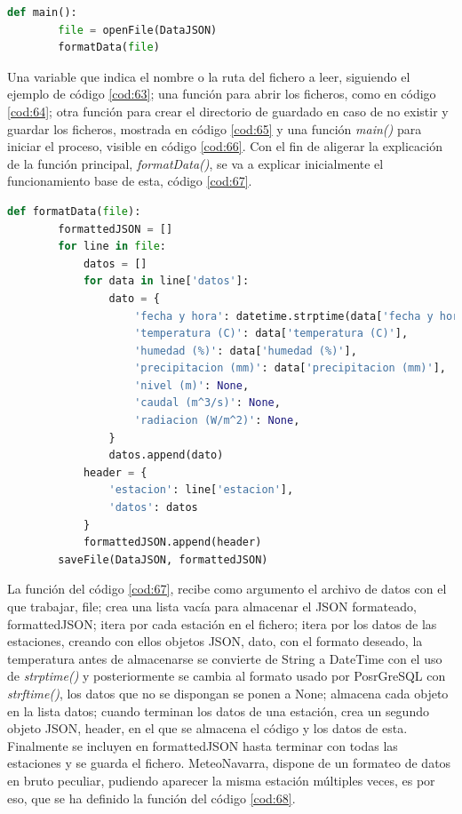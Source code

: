 \begin{lstlisting}[language=Python, caption={Declaración función \textit{main()}}, label=cod:66]
	def main():
		file = openFile(DataJSON)
		formatData(file)
\end{lstlisting}

Una variable que indica el nombre o la ruta del fichero a leer, siguiendo el ejemplo de código \ref{cod:63}; una función para abrir los ficheros, como en código \ref{cod:64}; otra función para crear el directorio de guardado en caso de no existir y guardar los ficheros, mostrada en código \ref{cod:65} y una función \textit{main()} para iniciar el proceso, visible en código \ref{cod:66}. Con el fin de aligerar la explicación de la función principal, \textit{formatData()}, se va a explicar inicialmente el funcionamiento base de esta, código \ref{cod:67}.

\begin{lstlisting}[language=Python, caption={Declaración función base \textit{formatData()}, concretamente esta versión es usada para formatear los datos de Aemet}, label=cod:67]
	def formatData(file):
		formattedJSON = []
		for line in file:
			datos = []
			for data in line['datos']:
				dato = {
					'fecha y hora': datetime.strptime(data['fecha y hora'], "%d/%m/%Y %H:%M:%S").strftime("%Y-%m-%d %H:%M"),
					'temperatura (C)': data['temperatura (C)'],
					'humedad (%)': data['humedad (%)'],
					'precipitacion (mm)': data['precipitacion (mm)'],
					'nivel (m)': None,
					'caudal (m^3/s)': None,
					'radiacion (W/m^2)': None,
				}
				datos.append(dato)
			header = {
				'estacion': line['estacion'],
				'datos': datos
			}
			formattedJSON.append(header)
		saveFile(DataJSON, formattedJSON)
\end{lstlisting}

La función del código \ref{cod:67}, recibe como argumento el archivo de datos con el que trabajar, file; crea una lista vacía para almacenar el JSON formateado, formattedJSON; itera por cada estación en el fichero; itera por los datos de las estaciones, creando con ellos objetos JSON, dato, con el formato deseado, la temperatura antes de almacenarse se convierte de String a DateTime con el uso de \textit{strptime()} y posteriormente se cambia al formato usado por PosrGreSQL con \textit{strftime()}, los datos que no se dispongan se ponen a None; almacena cada objeto en la lista datos; cuando terminan los datos de una estación, crea un segundo objeto JSON, header, en el que se almacena el código y los datos de esta. Finalmente se incluyen en formattedJSON hasta terminar con todas las estaciones y se guarda el fichero.\newline
\newline
MeteoNavarra, dispone de un formateo de datos en bruto peculiar, pudiendo aparecer la misma estación múltiples veces, es por eso, que se ha definido la función del código \ref{cod:68}.

